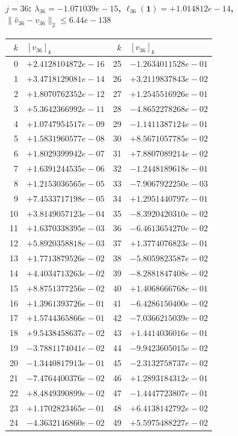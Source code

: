 \documentclass[11pt]{article}
\begin{document}
\paragraph{$j = 36$: $\lambda_{36} = -1.071039e-15$, \quad $\ell_{36}(\mathbf{1}) = +1.014812e-14$, \quad $\|\hat{v}_{36} - v_{36}\|_2 \leq 6.44e-138$}
\begin{center}
{\footnotesize
\begin{tabular}{r@{\;\;}l@{\quad}r@{\;\;}l}
\toprule
$k$ & $[v_{36}]_k$ & $k$ & $[v_{36}]_k$ \\
\midrule
0 & $+2.4128104872e-16$ & 25 & $-1.2634011528e-01$ \\
1 & $+3.4718129081e-14$ & 26 & $+3.2119837843e-02$ \\
2 & $+1.8070762352e-12$ & 27 & $+1.2545516926e-01$ \\
3 & $+5.3642366992e-11$ & 28 & $-4.8652278268e-02$ \\
4 & $+1.0747954517e-09$ & 29 & $-1.1411387124e-01$ \\
5 & $+1.5831960577e-08$ & 30 & $+8.5671057785e-02$ \\
6 & $+1.8029399942e-07$ & 31 & $+7.8807089214e-02$ \\
7 & $+1.6391244535e-06$ & 32 & $-1.2448189618e-01$ \\
8 & $+1.2153036565e-05$ & 33 & $-7.9067922250e-03$ \\
9 & $+7.4533717198e-05$ & 34 & $+1.2951440797e-01$ \\
10 & $+3.8149057123e-04$ & 35 & $-8.3920420310e-02$ \\
11 & $+1.6370338395e-03$ & 36 & $-6.4613654270e-02$ \\
12 & $+5.8920358818e-03$ & 37 & $+1.3774076823e-01$ \\
13 & $+1.7713879526e-02$ & 38 & $-5.8059823587e-02$ \\
14 & $+4.4034713263e-02$ & 39 & $-8.2881847408e-02$ \\
15 & $+8.8751377256e-02$ & 40 & $+1.4068666768e-01$ \\
16 & $+1.3961393726e-01$ & 41 & $-6.4286150400e-02$ \\
17 & $+1.5744365866e-01$ & 42 & $-7.0366215039e-02$ \\
18 & $+9.5438458637e-02$ & 43 & $+1.4414036016e-01$ \\
19 & $-3.7881174041e-02$ & 44 & $-9.9423605015e-02$ \\
20 & $-1.3440817913e-01$ & 45 & $-2.3132758737e-02$ \\
21 & $-7.4764400376e-02$ & 46 & $+1.2893184312e-01$ \\
22 & $+8.4849390899e-02$ & 47 & $-1.4447723807e-01$ \\
23 & $+1.1702823465e-01$ & 48 & $+6.4138142792e-02$ \\
24 & $-4.3632146860e-02$ & 49 & $+5.5975488227e-02$ \\
\bottomrule
\end{tabular}
}
\end{center}
\end{document}
